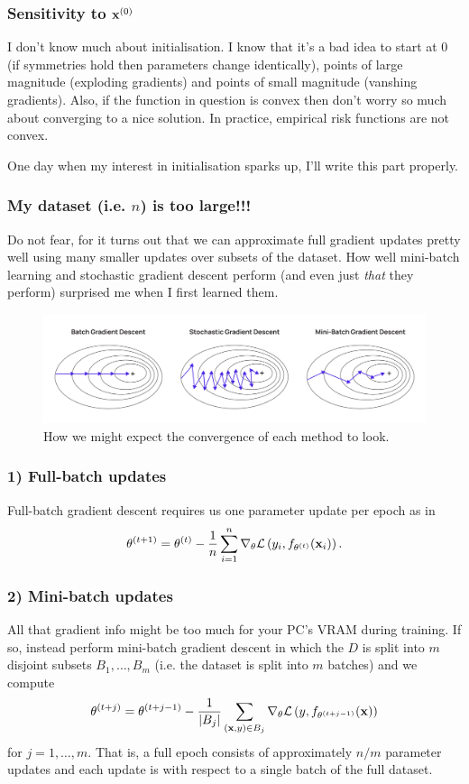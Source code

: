 \documentclass[11pt]{article}
\begin{document}
\subsubsection{Sensitivity to $\mathbf{x}^{(0)}$}
I don't know much about initialisation. I know that it's a bad idea to start at 0 (if symmetries hold then parameters change identically), points of large magnitude (exploding gradients) and points of small magnitude (vanshing gradients). Also, if the function in question is convex then don't worry so much about converging to a nice solution. In practice, empirical risk functions are not convex.

One day when my interest in initialisation sparks up, I'll write this part properly.

\subsubsection{My dataset (i.e. $n$) is too large!!!}
Do not fear, for it turns out that we can approximate full gradient updates pretty well using many smaller updates over subsets of the dataset. How well mini-batch learning and stochastic gradient descent perform (and even just \textit{that} they perform) surprised me when I first learned them.

\begin{figure}[t]
    \centering
    \includegraphics[width=\columnwidth]{./figures/gradient_descent/gradient_descent_types.png}
    \caption{How we might expect the convergence of each method to look. }
    \label{fig:gradient_descent_types}
\end{figure}

\subsubsection*{1) Full-batch updates}
Full-batch gradient descent requires us one parameter update per epoch as in
$$
\theta^{(t+1)}
=
\theta^{(t)}-\frac{1}{n}\sum_{i=1}^n \nabla_{\theta}\mathcal{L}\left(y_i,f_{\theta^{(t)}}(\mathbf{x}_i)\right).
$$

\subsubsection*{2) Mini-batch updates}
All that gradient info might be too much for your PC's VRAM during training. If so, instead perform mini-batch gradient descent in which the $D$ is split into $m$ disjoint subsets $B_1,\dots,B_m$ (i.e. the dataset is split into $m$ batches) and we compute
$$
\theta^{(t+j)}
=
\theta^{(t+j-1)}-\frac{1}{|B_j|}\sum_{(\mathbf{x},y)\in B_j} \nabla_{\theta}\mathcal{L}\left(y,f_{\theta^{(t+j-1)}}(\mathbf{x})\right)
$$
for $j=1,\dots,m$. That is, a full epoch consists of approximately $n/m$ parameter updates and each update is with respect to a single batch of the full dataset.
\end{document}
